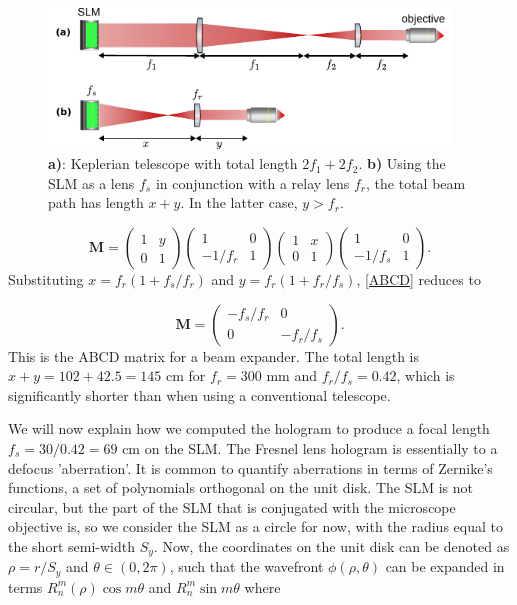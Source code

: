 \begin{figure}
	\centering
	\includegraphics[width=0.95\textwidth]{figures/beampathSLM.pdf}
	\caption{\textsf{\textbf{a)}}: Keplerian telescope with total length $2f_1+2f_2$. \textsf{\textbf{b)}} Using the SLM as a lens $f_s$ in conjunction with a relay lens $f_r$, the total beam path has length $x+y$. In the latter case, $y>f_r$.}
	\label{fig:SLMbeampath}
\end{figure}

\begin{equation}\label{ABCD}
	\mathbf{M}=
	\begin{pmatrix}
		1 & y \\
		0 & 1
	\end{pmatrix}
	\begin{pmatrix}
		1 & 0 \\
		-1/f_r & 1
	\end{pmatrix}
	\begin{pmatrix}
		1 & x \\
		0 & 1
	\end{pmatrix}
	\begin{pmatrix}
		1 & 0 \\
		-1/f_s & 1
	\end{pmatrix}.
\end{equation}
Substituting $x= f_r(1+f_s/f_r)$ and $y=f_r(1+f_r/f_s)$, \cref{ABCD} reduces to

\begin{equation}
	\mathbf{M}=
	\begin{pmatrix}
		-f_s/f_r & 0\\
		0 & -f_r/f_s
	\end{pmatrix}.
\end{equation}
This is the ABCD matrix for a beam expander. The total length is $x+y = 102 + 42.5 = 145$ cm for $f_r = 300$ mm and $f_r/f_s=0.42$, which is significantly shorter than when using a conventional telescope.

We will now explain how we computed the hologram to produce a focal length $f_s = 30 / 0.42 = 69$ cm on the SLM.
The Fresnel lens hologram is essentially to a defocus 'aberration'.
It is common to quantify aberrations in terms of Zernike's functions, a set of polynomials orthogonal on the unit disk. 
The SLM is not circular, but the part of the SLM that is conjugated with the microscope objective is, so we consider the SLM as a circle for now, with the radius equal to the short semi-width $S_y$.
Now, the coordinates on the unit disk can be denoted as $\rho = r/S_y$ and $\theta \in (0, 2\pi)$, such that the wavefront $\phi(\rho,\theta)$ can be expanded in terms $R_n^m(\rho)\cos{m\theta}$ and $R_n^m\sin{m\theta}$ where 

